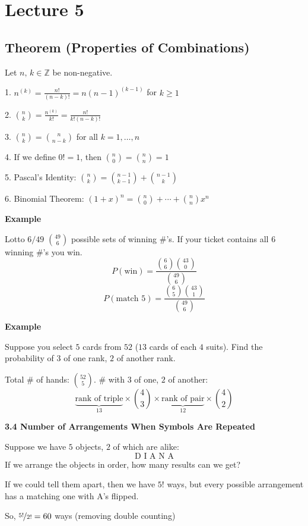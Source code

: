 \section{Lecture 5}
\begin{thmbox}
    \subsection{Theorem (Properties of Combinations)}
    Let $ n,\,k\in \mathbb{Z} $ be non-negative.
    
    1. $ n^{(k)}=\frac{n!}{(n-k)!}=n(n-1)^{(k-1)} $ for $ k\ge 1 $

    2. $ \binom{n}{k}=\frac{n^{(k)}}{k!}=\frac{n!}{k!(n-k)!} $

    3. $\binom{n}{k}=\binom{n}{n-k}$ for all $ k=1,\ldots,n $

    4. If we define $ 0!=1 $, then $\binom{n}{0}=\binom{n}{n}=1$

    5. Pascal's Identity: $\binom{n}{k}=\binom{n-1}{k-1}+\binom{n-1}{k}$

    6. Binomial Theorem: $ (1+x)^n=\binom{n}{0}+\cdots +\binom{n}{n}x^n $
\end{thmbox}

\textbf{Example}

Lotto $ 6/49 $ $ \binom{49}{6} $ possible sets of winning \#'s. If your
ticket contains all $ 6 $ winning \#'s you win.
\[ P(\text{win})=\frac{\binom{6}{6}\binom{43}{0}}{\binom{49}{6}} \]
\[ P(\text{match }5)=\frac{\binom{6}{5}\binom{43}{1}}{\binom{49}{6}} \]

\textbf{Example}

Suppose you select $ 5 $ cards from $ 52 $ ($ 13 $ cards of each $ 4 $ suits).
Find the probability of $ 3 $ of one rank, $ 2 $ of another rank.

Total \# of hands: $ \binom{52}{5} $.
\# with $ 3 $ of one, $2$ of another:
\[ \underbrace{\text{rank of triple}}_{13}\times \binom{4}{3}\times
\underbrace{\text{rank of pair}}_{12}\times \binom{4}{2} \]

\textbf{3.4 Number of Arrangements When Symbols Are Repeated}

Suppose we have $ 5 $ objects, $ 2 $ of which are alike:
\[ \text{D I A N A} \]
If we arrange the objects in order, how many results can we get?

If we could tell them apart, then we have $ 5! $ ways,
but every possible arrangement has a matching one with A's flipped.

So, $ \nicefrac{5!}{2!} =60 $ ways (removing double counting)


